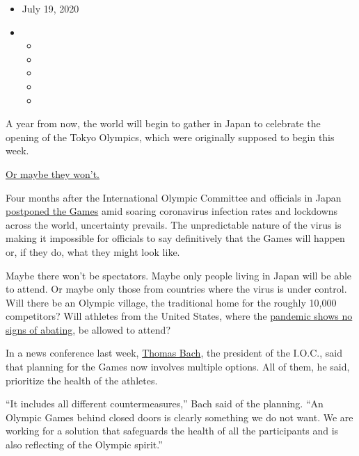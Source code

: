 \begin{itemize}
\item
  July 19, 2020
\item
  \begin{itemize}
  \item
  \item
  \item
  \item
  \item
  \end{itemize}
\end{itemize}

A year from now, the world will begin to gather in Japan to celebrate
the opening of the Tokyo Olympics, which were originally supposed to
begin this week.

\href{https://www.nytimes3xbfgragh.onion/2020/05/22/sports/olympics/coronavirus-tokyo-olympics.html}{Or
maybe they won't.}

Four months after the International Olympic Committee and officials in
Japan
\href{https://www.nytimes3xbfgragh.onion/2020/03/30/sports/olympics/tokyo-olympics-date-coronavirus.html}{postponed
the Games} amid soaring coronavirus infection rates and lockdowns across
the world, uncertainty prevails. The unpredictable nature of the virus
is making it impossible for officials to say definitively that the Games
will happen or, if they do, what they might look like.

Maybe there won't be spectators. Maybe only people living in Japan will
be able to attend. Or maybe only those from countries where the virus is
under control. Will there be an Olympic village, the traditional home
for the roughly 10,000 competitors? Will athletes from the United
States, where the
\href{https://www.nytimes3xbfgragh.onion/news-event/coronavirus?action=click\&pgtype=Article\&state=default\&module=styln-coronavirus\&variant=show\&region=TOP_BANNER\&context=storylines_menu}{pandemic
shows no signs of abating}, be allowed to attend?

In a news conference last week,
\href{https://www.nytimes3xbfgragh.onion/2020/03/19/sports/olympics/olympics-coronavirus-bach-ioc.html}{Thomas
Bach}, the president of the I.O.C., said that planning for the Games now
involves multiple options. All of them, he said, prioritize the health
of the athletes.

``It includes all different countermeasures,'' Bach said of the
planning. ``An Olympic Games behind closed doors is clearly something we
do not want. We are working for a solution that safeguards the health of
all the participants and is also reflecting of the Olympic spirit.''

